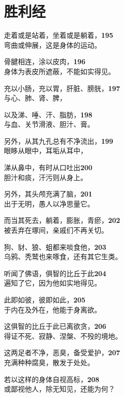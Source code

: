 \section{胜利经}


走着或是站着，坐着或是躺着，\hfill{\grayfootnotesize \textbf{195}} \\
弯曲或伸展，这是身体的运动。


骨腱相连，涂以皮肉，\hfill{\grayfootnotesize \textbf{196}} \\
身体为表皮所遮蔽，不能如实得见。


充以小肠，充以胃，肝脏、膀胱，\hfill{\grayfootnotesize \textbf{197}} \\
与心、肺、肾、脾，


以及涕、唾、汗、脂肪，\hfill{\grayfootnotesize \textbf{198}} \\
与血、关节滑液、胆汁、膏。

另外，从其九孔总有不净流出，\hfill{\grayfootnotesize \textbf{199}} \\
眼眵从眼中，耳垢从耳中，


涕从鼻中，有时从口吐出\hfill{\grayfootnotesize \textbf{200}} \\
胆汁和痰，汗污则从身上。


另外，其头颅充满了脑，\hfill{\grayfootnotesize \textbf{201}} \\
出于无明，愚人以净思量它。


而当其死去，躺着，膨胀，青瘀，\hfill{\grayfootnotesize \textbf{202}} \\
被丢弃在塚间，亲戚们不再关切。


狗、豺、狼、蛆都来啖食他，\hfill{\grayfootnotesize \textbf{203}} \\
乌鸦、秃鹫也来啄食，还有其它生类。


听闻了佛语，俱智的比丘于此\hfill{\grayfootnotesize \textbf{204}} \\
遍知了它，因为他如实地得见。


此即如彼，彼即如此，\hfill{\grayfootnotesize \textbf{205}} \\
于内在及外在，他能于身离欲。


这俱智的比丘于此已离欲贪，\hfill{\grayfootnotesize \textbf{206}} \\
得证不死、寂静、涅槃、不殁的境地。


这两足者不净，恶臭，备受爱护，\hfill{\grayfootnotesize \textbf{207}} \\
充满种种腐臭，散发于处处。


若以这样的身体自视高标，\hfill{\grayfootnotesize \textbf{208}} \\
或鄙视他人，除无知见，还能为何？


